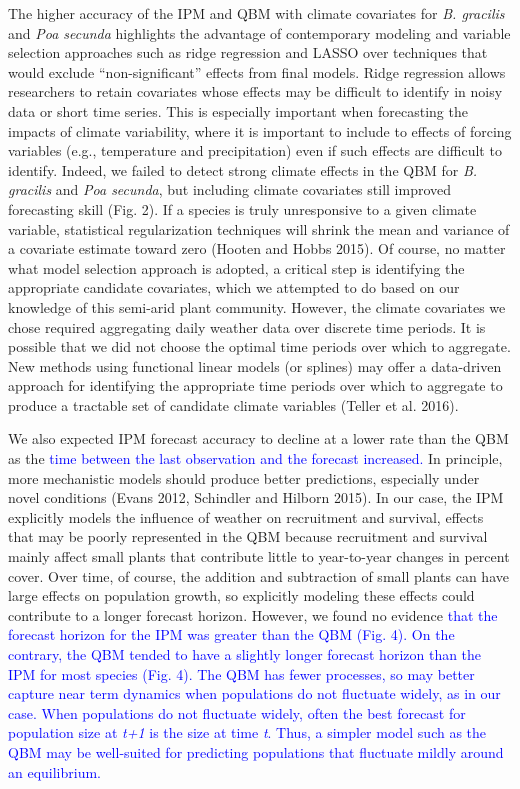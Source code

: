 \documentclass[12pt,]{article}
\begin{document}
The higher accuracy of the IPM and QBM with climate covariates for
\emph{B. gracilis} and \emph{Poa secunda} highlights the advantage of
contemporary modeling and variable selection approaches such as ridge
regression and LASSO over techniques that would exclude
``non-significant'' effects from final models. Ridge regression allows
researchers to retain covariates whose effects may be difficult to
identify in noisy data or short time series. This is especially
important when forecasting the impacts of climate variability, where it
is important to include to effects of forcing variables (e.g.,
temperature and precipitation) even if such effects are difficult to
identify. Indeed, we failed to detect strong climate effects in the QBM
for \emph{B. gracilis} and \emph{Poa secunda}, but including climate
covariates still improved forecasting skill (Fig. 2). If a species is
truly unresponsive to a given climate variable, statistical
regularization techniques will shrink the mean and variance of a
covariate estimate toward zero (Hooten and Hobbs 2015). Of course, no
matter what model selection approach is adopted, a critical step is
identifying the appropriate candidate covariates, which we attempted to
do based on our knowledge of this semi-arid plant community. However,
the climate covariates we chose required aggregating daily weather data
over discrete time periods. It is possible that we did not choose the
optimal time periods over which to aggregate. New methods using
functional linear models (or splines) may offer a data-driven approach
for identifying the appropriate time periods over which to aggregate to
produce a tractable set of candidate climate variables (Teller et al.
2016).

We also expected IPM forecast accuracy to decline at a lower rate than
the QBM as the
\textcolor{blue}{time between the last observation and the forecast increased.}
In principle, more mechanistic models should produce better predictions,
especially under novel conditions (Evans 2012, Schindler and Hilborn
2015). In our case, the IPM explicitly models the influence of weather
on recruitment and survival, effects that may be poorly represented in
the QBM because recruitment and survival mainly affect small plants that
contribute little to year-to-year changes in percent cover. Over time,
of course, the addition and subtraction of small plants can have large
effects on population growth, so explicitly modeling these effects could
contribute to a longer forecast horizon. However, we found no evidence
\textcolor{blue}{that the forecast horizon for the IPM was greater than the QBM (Fig. 4).
On the contrary, the QBM tended to have a slightly longer forecast horizon than the IPM for most species (Fig. 4).
The QBM has fewer processes, so may better capture near term dynamics when populations do not fluctuate widely, as in our case.
When populations do not fluctuate widely, often the best forecast for population size at \emph{t+1} is the size at time \emph{t}.
Thus, a simpler model such as the QBM may be well-suited for predicting populations that fluctuate mildly around an equilibrium.}
\end{document}
